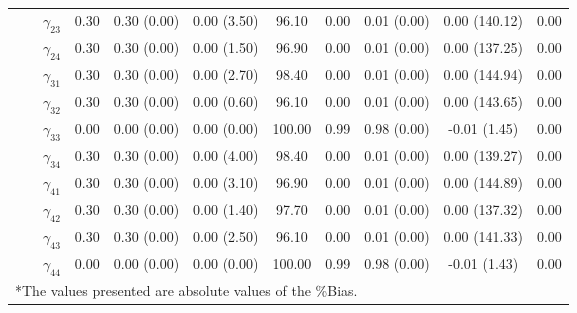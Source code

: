 \begin{table}[h]
{\begin{tabular}{ccccccccccc}
 &  & $\gamma_{23}$ & 0.30 & 0.30 (0.00) & 0.00 (3.50) & 96.10 & 0.00 & 0.01 (0.00) & 0.00 (140.12) & 0.00 \\
 &  & $\gamma_{24}$ & 0.30 & 0.30 (0.00) & 0.00 (1.50) & 96.90 & 0.00 & 0.01 (0.00) & 0.00 (137.25) & 0.00 \\
 &  & $\gamma_{31}$ & 0.30 & 0.30 (0.00) & 0.00 (2.70) & 98.40 & 0.00 & 0.01 (0.00) & 0.00 (144.94) & 0.00 \\
 &  & $\gamma_{32}$ & 0.30 & 0.30 (0.00) & 0.00 (0.60) & 96.10 & 0.00 & 0.01 (0.00) & 0.00 (143.65) & 0.00 \\
 &  & $\gamma_{33}$ & 0.00 & 0.00 (0.00) & 0.00 (0.00) & 100.00 & 0.99 & 0.98 (0.00) & -0.01 (1.45) & 0.00 \\
 &  & $\gamma_{34}$ & 0.30 & 0.30 (0.00) & 0.00 (4.00) & 98.40 & 0.00 & 0.01 (0.00) & 0.00 (139.27) & 0.00 \\
 &  & $\gamma_{41}$ & 0.30 & 0.30 (0.00) & 0.00 (3.10) & 96.90 & 0.00 & 0.01 (0.00) & 0.00 (144.89) & 0.00 \\
 &  & $\gamma_{42}$ & 0.30 & 0.30 (0.00) & 0.00 (1.40) & 97.70 & 0.00 & 0.01 (0.00) & 0.00 (137.32) & 0.00 \\
 &  & $\gamma_{43}$ & 0.30 & 0.30 (0.00) & 0.00 (2.50) & 96.10 & 0.00 & 0.01 (0.00) & 0.00 (141.33) & 0.00 \\
 &  & $\gamma_{44}$ & 0.00 & 0.00 (0.00) & 0.00 (0.00) & 100.00 & 0.99 & 0.98 (0.00) & -0.01 (1.43) & 0.00 \\

\bottomrule 
\multicolumn{10}{l}{*The values presented are absolute values of the \%Bias.}
\end{tabular}}
\label{tgr1_4}
\end{table}



